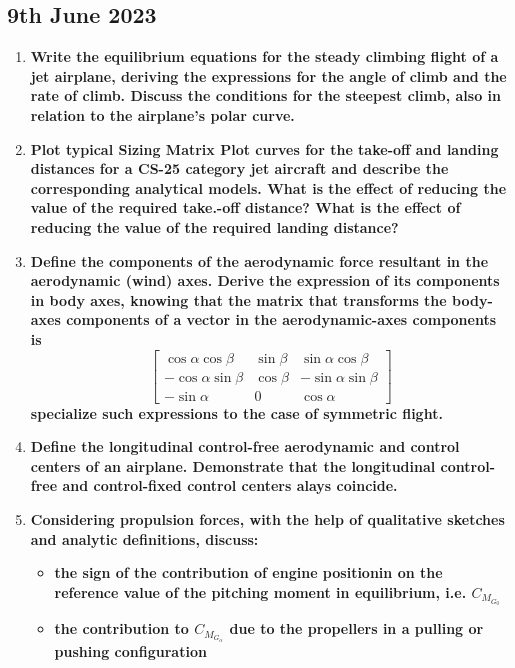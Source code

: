 \subsection{9th June 2023}
\begin{enumerate}
    \item \textbf{Write the equilibrium equations for the steady climbing flight of a jet airplane, deriving the expressions for the angle of climb and the rate of climb. Discuss the conditions for the steepest climb, also in relation to the airplane's polar curve.}
    \item \textbf{Plot typical Sizing Matrix Plot curves for the take-off and landing distances for a CS-25 category jet aircraft and describe the corresponding analytical models. What is the effect of reducing the value of the required take.-off distance? What is the effect of reducing the value of the required landing distance?}
    \item \textbf{Define the components of the aerodynamic force resultant in the aerodynamic (wind) axes. Derive the expression of its components in body axes, knowing that the matrix that transforms the body-axes components of a vector in the aerodynamic-axes components is}
    \begin{equation}
        \begin{bmatrix}
            \cos\alpha \cos\beta & \sin \beta  & \sin\alpha \cos\beta\\
            -\cos\alpha \sin\beta & \cos \beta & -\sin\alpha \sin \beta\\
            -\sin \alpha & 0 & \cos\alpha
        \end{bmatrix}
    \end{equation}
    \textbf{specialize such expressions to the case of symmetric flight.}
    \item \textbf{Define the longitudinal control-free aerodynamic and control centers of an airplane. Demonstrate that the longitudinal control-free and control-fixed control centers alays coincide.}
    \item \textbf{Considering propulsion forces, with the help of qualitative sketches and analytic definitions, discuss:}
    \begin{itemize}
        \item \textbf{the sign of the contribution of engine positionin on the reference value of the pitching moment in equilibrium, i.e. $C_{M_{G_0}}$}
        \item \textbf{the contribution to $C_{M_{G_\alpha}}$ due to the propellers in a pulling or pushing configuration}

\end{itemize}
\end{enumerate}
